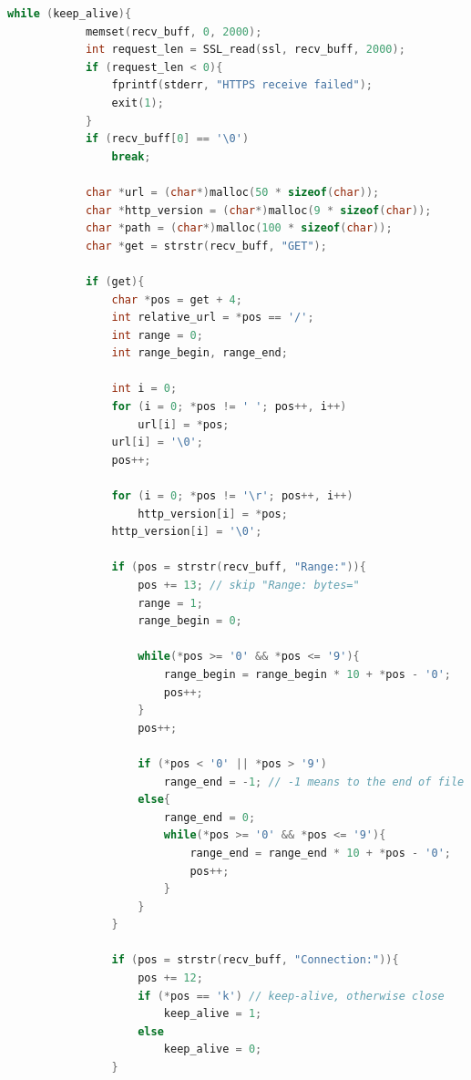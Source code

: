 \documentclass[UTF8]{article}
\begin{document}
\begin{lstlisting}[language=c]
        while (keep_alive){
            memset(recv_buff, 0, 2000);
            int request_len = SSL_read(ssl, recv_buff, 2000);
            if (request_len < 0){
                fprintf(stderr, "HTTPS receive failed");
                exit(1);
            }
            if (recv_buff[0] == '\0')
                break;
    
            char *url = (char*)malloc(50 * sizeof(char));
            char *http_version = (char*)malloc(9 * sizeof(char));
            char *path = (char*)malloc(100 * sizeof(char));
            char *get = strstr(recv_buff, "GET");
    
            if (get){
                char *pos = get + 4;
                int relative_url = *pos == '/';
                int range = 0;
                int range_begin, range_end;
    
                int i = 0;
                for (i = 0; *pos != ' '; pos++, i++)
                    url[i] = *pos;
                url[i] = '\0';
                pos++;
    
                for (i = 0; *pos != '\r'; pos++, i++)
                    http_version[i] = *pos;
                http_version[i] = '\0';
    
                if (pos = strstr(recv_buff, "Range:")){
                    pos += 13; // skip "Range: bytes="
                    range = 1;
                    range_begin = 0;
    
                    while(*pos >= '0' && *pos <= '9'){
                        range_begin = range_begin * 10 + *pos - '0';
                        pos++;
                    }
                    pos++;
    
                    if (*pos < '0' || *pos > '9')
                        range_end = -1; // -1 means to the end of file
                    else{
                        range_end = 0;
                        while(*pos >= '0' && *pos <= '9'){
                            range_end = range_end * 10 + *pos - '0';
                            pos++;
                        }
                    }
                }
    
                if (pos = strstr(recv_buff, "Connection:")){
                    pos += 12;
                    if (*pos == 'k') // keep-alive, otherwise close
                        keep_alive = 1;
                    else
                        keep_alive = 0;
                }
    

\end{lstlisting}
\end{document}
